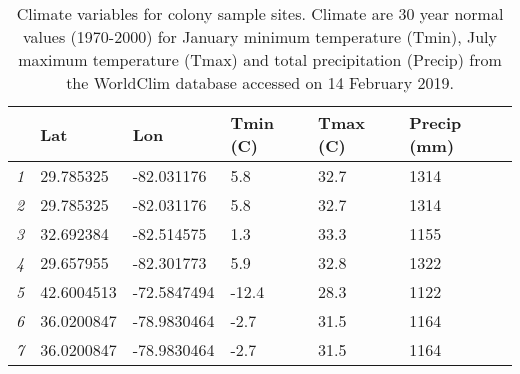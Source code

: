 \begin{table}[ht]
\centering
\begin{tabular}{rlllll}
  \hline
 & Lat & Lon & Tmin (C) & Tmax (C) & Precip (mm) \\ 
  \hline
{\emph{1}} & 29.785325 & -82.031176 & 5.8 & 32.7 & 1314 \\ 
  {\emph{2}} & 29.785325 & -82.031176 & 5.8 & 32.7 & 1314 \\ 
  {\emph{3}} & 32.692384 & -82.514575 & 1.3 & 33.3 & 1155 \\ 
  {\emph{4}} & 29.657955 & -82.301773 & 5.9 & 32.8 & 1322 \\ 
  {\emph{5}} & 42.6004513 & -72.5847494 & -12.4 & 28.3 & 1122 \\ 
  {\emph{6}} & 36.0200847 & -78.9830464 & -2.7 & 31.5 & 1164 \\ 
  {\emph{7}} & 36.0200847 & -78.9830464 & -2.7 & 31.5 & 1164 \\ 
   \hline
\end{tabular}
\caption{Climate variables for colony sample sites. Climate are 30 year normal values (1970-2000) for January minimum temperature (Tmin), July maximum temperature (Tmax) and total precipitation (Precip) from the WorldClim database accessed on 14 February 2019.} 
\label{tab:climate}
\end{table}

